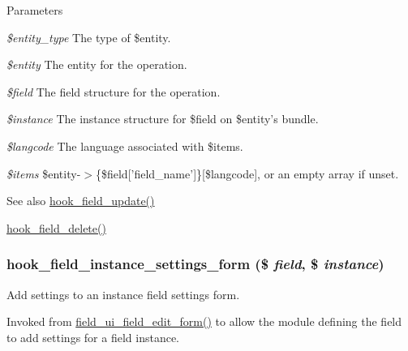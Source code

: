 \begin{DoxyParams}{Parameters}
\item[{\em \$entity\_\-type}]The type of \$entity. \item[{\em \$entity}]The entity for the operation. \item[{\em \$field}]The field structure for the operation. \item[{\em \$instance}]The instance structure for \$field on \$entity's bundle. \item[{\em \$langcode}]The language associated with \$items. \item[{\em \$items}]\$entity-\/$>$\{\$field\mbox{[}'field\_\-name'\mbox{]}\}\mbox{[}\$langcode\mbox{]}, or an empty array if unset.\end{DoxyParams}
\begin{DoxySeeAlso}{See also}
\hyperlink{group__field__types_gaca5bc4f8ab69818f23783af24454d9c4}{hook\_\-field\_\-update()} 

\hyperlink{group__field__types_gaf1e5787044b83d34cf7daed3d5297336}{hook\_\-field\_\-delete()} 
\end{DoxySeeAlso}
\hypertarget{group__field__types_gacce0ff92e36c0054ad131d95e576a13a}{
\subsubsection[{hook\_\-field\_\-instance\_\-settings\_\-form}]{\setlength{\rightskip}{0pt plus 5cm}hook\_\-field\_\-instance\_\-settings\_\-form (\$ {\em field}, \/  \$ {\em instance})}}
\label{group__field__types_gacce0ff92e36c0054ad131d95e576a13a}
Add settings to an instance field settings form.

Invoked from \hyperlink{group__forms_ga11660e91b3649ff30bf665c00f1a9af2}{field\_\-ui\_\-field\_\-edit\_\-form()} to allow the module defining the field to add settings for a field instance.



